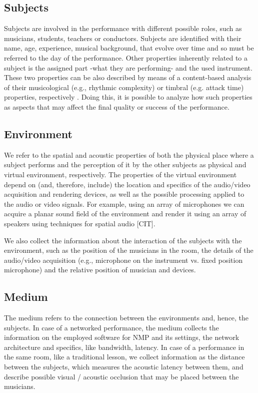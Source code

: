 \subsection{Subjects}
Subjects are involved in the performance with different possible roles, such as musicians, students, teachers or conductors. Subjects are identified with their name, age, experience, musical background, that evolve over time and so must be referred to the day of the performance. Other properties inherently related to a subject is the assigned part -what they are performing- and the used instrument. These two properties can be also described by means of a content-based analysis of their musicological (e.g., rhythmic complexity) or timbral (e.g. attack time) properties, respectively \cite{RottondiFeature}.
Doing this, it is possible to analyze how such properties as aspects that may affect the final quality or success of the performance.


\subsection{Environment}
We refer to the spatial and acoustic properties of both the physical place where a subject performs and the perception of it by the other subjects as physical and virtual environment, respectively. The properties of the virtual environment depend on (and, therefore, include) the location and specifics of the audio/video acquisition and rendering devices, as well as the possible processing applied to the audio or video signals. For example, using an array of microphones we can acquire a planar sound field of the environment and render it using an array of speakers using techniques for spatial audio [CIT]. 

We also collect the information about the interaction of the subjects with the environment, such as the position of the musicians in the room, the details of the audio/video acquisition (e.g., microphone on the instrument vs. fixed position microphone) and the relative position of musician and devices. 

\subsection{Medium}
The medium refers to the connection between the environments and, hence, the subjects. In case of a networked performance, the medium collects the information on the employed software for NMP and its settings, the network architecture and specifics, like bandwidth, latency. In case of a performance in the same room, like a traditional lesson, we collect information as the distance between the subjects, which measures the acoustic latency between them, and describe possible visual / acoustic occlusion that may be placed between the musicians. 

